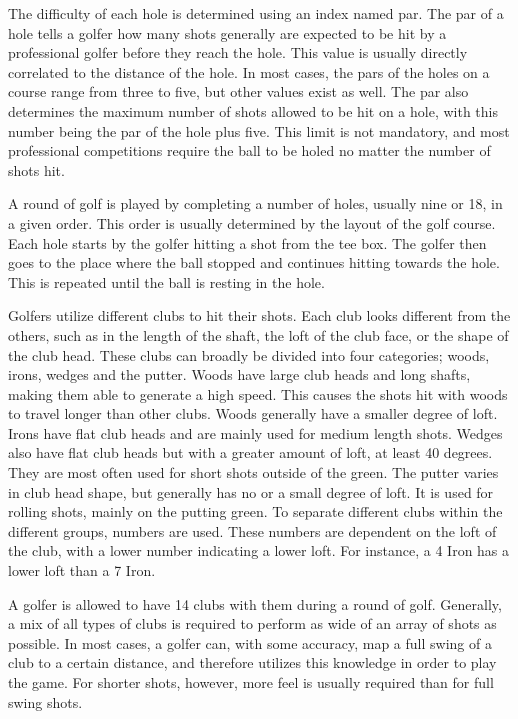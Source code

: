 \documentclass{kththesis}
\begin{document}
The difficulty of each hole is determined using an index named par. The par of a hole tells a golfer how many shots generally are expected to be hit by a professional golfer before they reach the hole. This value is usually directly correlated to the distance of the hole. In most cases, the pars of the holes on a course range from three to five, but other values exist as well. The par also determines the maximum number of shots allowed to be hit on a hole, with this number being the par of the hole plus five. This limit is not mandatory, and most professional competitions require the ball to be holed no matter the number of shots hit.

A round of golf is played by completing a number of holes, usually nine or 18, in a given order. This order is usually determined by the layout of the golf course. Each hole starts by the golfer hitting a shot from the tee box. The golfer then goes to the place where the ball stopped and continues hitting towards the hole. This is repeated until the ball is resting in the hole.

Golfers utilize different clubs to hit their shots. Each club looks different from the others, such as in the length of the shaft, the loft of the club face, or the shape of the club head. These clubs can broadly be divided into four categories; woods, irons, wedges and the putter. Woods have large club heads and long shafts, making them able to generate a high speed. This causes the shots hit with woods to travel longer than other clubs. Woods generally have a smaller degree of loft. Irons have flat club heads and are mainly used for medium length shots. Wedges also have flat club heads but with a greater amount of loft, at least 40 degrees. They are most often used for short shots outside of the green. The putter varies in club head shape, but generally has no or a small degree of loft. It is used for rolling shots, mainly on the putting green. To separate different clubs within the different groups, numbers are used. These numbers are dependent on the loft of the club, with a lower number indicating a lower loft. For instance, a 4 Iron has a lower loft than a 7 Iron.

A golfer is allowed to have 14 clubs with them during a round of golf. Generally, a mix of all types of clubs is required to perform as wide of an array of shots as possible. In most cases, a golfer can, with some accuracy, map a full swing of a club to a certain distance, and therefore utilizes this knowledge in order to play the game. For shorter shots, however, more feel is usually required than for full swing shots.
\end{document}
